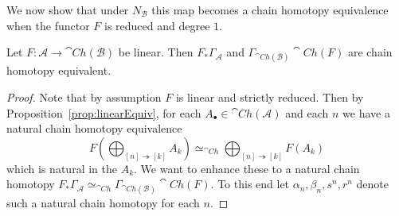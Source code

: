 We now show that under $N_\mathcal{B}$ this map becomes a chain homotopy equivalence when the functor $F$ is reduced and degree $1$.

\begin{lem}[label=lem:equivDef]
    Let $F:\mathcal{A}\to \cat{Ch}(\mathcal{B})$ be linear. Then $F_*\Gamma_\mathcal{A}$ and $\Gamma_{\cat{Ch}(\mathcal{B})}\cat{Ch}(F)$ are  chain homotopy equivalent.
\end{lem}
\begin{proof}
    Note that by assumption $F$ is linear and strictly reduced. Then by Proposition~\ref{prop:linearEquiv}, for each $A_\bullet \in \cat{Ch}(\mathcal{A})$ and each $n$ we have a natural chain homotopy equivalence
    \begin{equation*}
        F\left(\bigoplus_{[n]\twoheadrightarrow[k]}A_k\right) \simeq_{\cat{Ch}} \bigoplus_{[n]\twoheadrightarrow[k]}F(A_k)
    \end{equation*}
    which is natural in the $A_k$. We want to enhance these to a natural chain homotopy $F_*\Gamma_\mathcal{A}\simeq_{\cat{Ch}}\Gamma_{\cat{Ch}(\mathcal{B})}\cat{Ch}(F)$. To this end let $\alpha_n,\beta_n,s^n,r^n$ denote such a natural chain homotopy for each $n$. 
\end{proof}